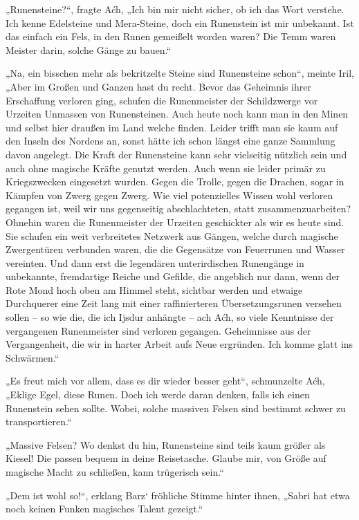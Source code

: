 „Runensteine?“, fragte Aćh, „Ich bin mir nicht sicher, ob ich das Wort verstehe. Ich kenne Edelsteine und Mera-Steine, doch ein Runenstein ist mir unbekannt. Ist das einfach ein Fels, in den Runen gemeißelt worden waren? Die Temm waren Meister darin, solche Gänge zu bauen.“

„Na, ein bisschen mehr als bekritzelte Steine sind Runensteine schon“, meinte Iril, „Aber im Großen und Ganzen hast du recht. Bevor das Geheimnis ihrer Erschaffung verloren ging, schufen die Runenmeister der Schildzwerge vor Urzeiten Unmassen von Runensteinen. Auch heute noch kann man in den Minen und selbst hier draußen im Land welche finden. Leider trifft man sie kaum auf den Inseln des Nordens an, sonst hätte ich schon längst eine ganze Sammlung davon angelegt. Die Kraft der Runensteine kann sehr vielseitig nützlich sein und auch ohne magische Kräfte genutzt werden. Auch wenn sie leider primär zu Kriegszwecken eingesetzt wurden. Gegen die Trolle, gegen die Drachen, sogar in Kämpfen von Zwerg gegen Zwerg. Wie viel potenzielles Wissen wohl verloren gegangen ist, weil wir uns gegenseitig abschlachteten, statt zusammenzuarbeiten? Ohnehin waren die Runenmeister der Urzeiten geschickter als wir es heute sind. Sie schufen ein weit verbreitetes Netzwerk aus Gängen, welche durch magische Zwergentüren verbunden waren, die die Gegensätze von Feuerrunen und Wasser vereinten. Und dann erst die legendären unterirdischen Runengänge in unbekannte, fremdartige Reiche und Gefilde, die angeblich nur dann, wenn der Rote Mond hoch oben am Himmel steht, sichtbar werden und etwaige Durchquerer eine Zeit lang mit einer raffinierteren Übersetzungsrunen versehen sollen – so wie die, die ich Ijsdur anhängte – ach Aćh, so viele Kenntnisse der vergangenen Runenmeister sind verloren gegangen. Geheimnisse aus der Vergangenheit, die wir in harter Arbeit aufs Neue ergründen. Ich komme glatt ins Schwärmen.“

„Es freut mich vor allem, dass es dir wieder besser geht“, schmunzelte Aćh, „Eklige Egel, diese Runen. Doch ich werde daran denken, falls ich einen Runenstein sehen sollte. Wobei, solche massiven Felsen sind bestimmt schwer zu transportieren.“

„Massive Felsen? Wo denkst du hin, Runensteine sind teils kaum größer als Kiesel! Die passen bequem in deine Reisetasche. Glaube mir, von Größe auf magische Macht zu schließen, kann trügerisch sein.“

„Dem ist wohl so!“, erklang Barz‘ fröhliche Stimme hinter ihnen, „Sabri hat etwa noch keinen Funken magisches Talent gezeigt.“

